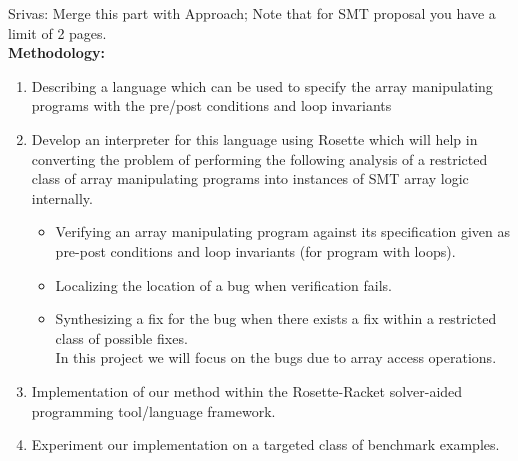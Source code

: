 \documentclass[a4paper, 12pt, notitlepage] {article}
\newcommand{\mscmt}[1]{{\color{blue} \tiny{Srivas: {#1}}}}
\begin{document}
\mscmt{Merge this part with Approach; Note that for SMT proposal you have a limit of 2 pages.} \\
{\bf Methodology:}
\begin{enumerate}
	\item  Describing a language which can be used to specify the array manipulating programs with the pre/post conditions and loop invariants \\
	\item Develop an interpreter for this language using Rosette which will help in converting the problem of performing the following analysis of a restricted class of array manipulating programs into instances of SMT array logic internally.
	\begin{itemize}
		\item Verifying an array manipulating program against its specification given as pre-post conditions and loop invariants (for program with loops).
		\item Localizing the location of a bug when verification fails.
		\item Synthesizing a fix for the bug when there exists a fix within a restricted class of possible fixes.\\
		In this project we will focus on the bugs due to array access operations.
	\end{itemize}
	
	\item Implementation of our method within the Rosette-Racket solver-aided programming tool/language framework.\
	
	\item Experiment our implementation on a targeted class of benchmark examples.
\end{enumerate}
\end{document}
